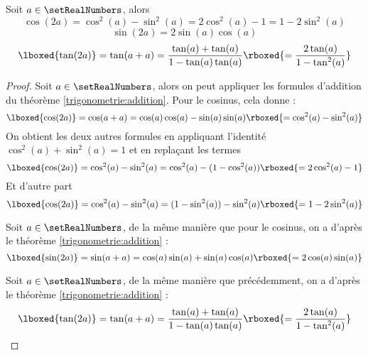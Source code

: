 \begin{lemma}
\label{trigonometrie:duplication:cosinus_sinus_tangente}
Soit $a \in \setRealNumbers$, alors 
\[
\cos(2a) = \cos^2(a) - \sin^2(a)=2 \cos^2(a) - 1= 1 - 2 \sin^2(a)
\]
\[
\sin(2a) = 2\sin(a)\cos(a)
\]
\[
\lboxed{\tan(2a)}=\tan(a+a) = \dfrac{\tan(a)+\tan(a)}{1-\tan(a)\tan(a)} \rboxed{= \dfrac{2\tan(a)}{1-\tan^2(a)}}
\]
\end{lemma}

\begin{proof}
Soit $a \in \setRealNumbers$, alors on peut appliquer les formules d'addition du théorème \ref{trigonometrie:addition}. Pour le cosinus, cela donne :
\[
\lboxed{\cos(2a)} = \cos(a + a)=\cos(a)\cos(a) - \sin(a)\sin(a) \rboxed{= \cos^2(a) - \sin^2(a)}
\]
On obtient les deux autres formules en appliquant l'identité $ \cos^2(a) + \sin^2(a) = 1$ et en replaçant les termes
\[
\lboxed{\cos(2a)} =  \cos^2(a) - \sin^2(a) =  \cos^2(a) - (1 - \cos^2(a)) \rboxed{= 2 \cos^2(a) - 1}
\]
Et d'autre part
\[
\lboxed{\cos(2a)} =  \cos^2(a) - \sin^2(a) =  (1 - \sin^2(a)) - \sin^2(a) \rboxed{= 1  - 2 \sin^2(a)}
\]

Soit $a \in \setRealNumbers$, de la même manière que pour le cosinus, on a d'après le théorème \ref{trigonometrie:addition} :
\[
\lboxed{\sin(2a)}=\sin(a+a) = \cos(a)\sin(a) + \sin(a)\cos(a) \rboxed{= 2\cos(a)\sin(a)}
\]

Soit $a \in \setRealNumbers$, de la même manière que précédemment, on a d'après le théorème \ref{trigonometrie:addition} :
\[
\lboxed{\tan(2a)}=\tan(a+a) = \dfrac{\tan(a)+\tan(a)}{1-\tan(a)\tan(a)} \rboxed{= \dfrac{2\tan(a)}{1-\tan^2(a)}}
\]
\end{proof}